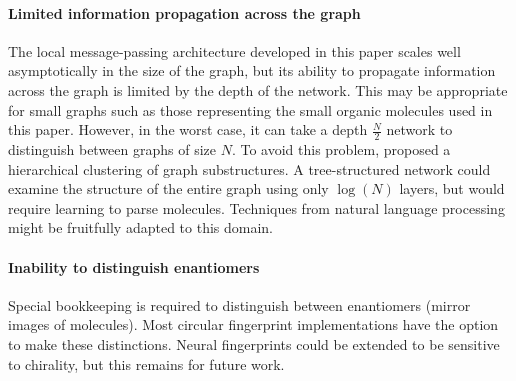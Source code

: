 \documentclass{article}
\begin{document}
\paragraph{Limited information propagation across the graph}
The local message-passing architecture developed in this paper scales well asymptotically in the size of the graph, but its ability to propagate information across the graph is limited by the depth of the network.
This may be appropriate for small graphs such as those representing the small organic molecules used in this paper.
However, in the worst case, it can take a depth $\frac{N}{2}$ network to distinguish between graphs of size $N$.
To avoid this problem, \citet{bruna2013spectral} proposed a hierarchical clustering of graph substructures.
A tree-structured network could examine the structure of the entire graph using only $\log(N)$ layers, but would require learning to parse molecules.
Techniques from natural language processing~\citep{tai2015improved} might be fruitfully adapted to this domain.

\paragraph{Inability to distinguish enantiomers}
Special bookkeeping is required to distinguish between enantiomers (mirror images of molecules).
Most circular fingerprint implementations have the option to make these distinctions.
Neural fingerprints could be extended to be sensitive to chirality, but this remains for future work.



\end{document}
